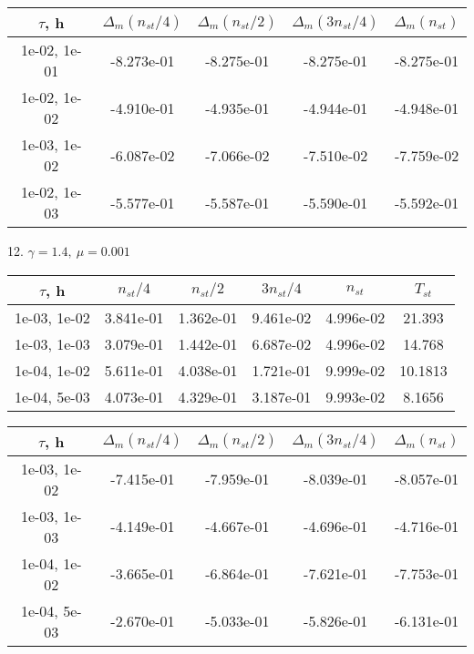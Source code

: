 \begin{center}
	\begin{tabular}{ |c|c|c|c|c| } 
		\hline
		$\tau$, h & $\Delta_m (n_{st}/ 4)$ & $\Delta_m (n_{st}/ 2)$ & $\Delta_m (3n_{st}/ 4)$ & $\Delta_m (n_{st})$ \\ 
		\hline
		1e-02, 1e-01 & -8.273e-01 & -8.275e-01 & -8.275e-01 & -8.275e-01 \\ 
		\hline
		1e-02, 1e-02 & -4.910e-01 & -4.935e-01 & -4.944e-01 & -4.948e-01 \\ 
		\hline
		1e-03, 1e-02 & -6.087e-02 & -7.066e-02 & -7.510e-02 & -7.759e-02 \\ 
		\hline
		1e-02, 1e-03 & -5.577e-01 & -5.587e-01 & -5.590e-01 & -5.592e-01 \\ 
		\hline
	\end{tabular}
\end{center}

12. $\gamma = 1.4, \ \mu = 0.001$
\begin{center}
	\begin{tabular}{ |c|c|c|c|c|c| } 
		\hline
		$\tau$, h & $n_{st}/ 4$ & $n_{st}/ 2$ & $3n_{st}/ 4$ & $n_{st}$ & $T_{st}$ \\ 
		\hline
		1e-03, 1e-02 & 3.841e-01 & 1.362e-01 & 9.461e-02 & 4.996e-02 & 21.393\\ 
		\hline
		1e-03, 1e-03 & 3.079e-01 & 1.442e-01 & 6.687e-02 & 4.996e-02 & 14.768\\ 
		\hline
		1e-04, 1e-02 & 5.611e-01 & 4.038e-01 & 1.721e-01 & 9.999e-02 & 10.1813\\ 
		\hline
		1e-04, 5e-03 & 4.073e-01 & 4.329e-01 & 3.187e-01 & 9.993e-02 & 8.1656\\ 
		\hline
	\end{tabular}
\end{center}

\begin{center}
	\begin{tabular}{ |c|c|c|c|c| } 
		\hline
		$\tau$, h & $\Delta_m (n_{st}/ 4)$ & $\Delta_m (n_{st}/ 2)$ & $\Delta_m (3n_{st}/ 4)$ & $\Delta_m (n_{st})$ \\ 
		\hline
		1e-03, 1e-02 & -7.415e-01 & -7.959e-01 & -8.039e-01 & -8.057e-01 \\ 
		\hline
		1e-03, 1e-03 & -4.149e-01 & -4.667e-01 & -4.696e-01 & -4.716e-01 \\ 
		\hline
		1e-04, 1e-02 & -3.665e-01 & -6.864e-01 & -7.621e-01 & -7.753e-01 \\ 
		\hline
		1e-04, 5e-03 & -2.670e-01 & -5.033e-01 & -5.826e-01 & -6.131e-01 \\ 
		\hline
	\end{tabular}
\end{center}

